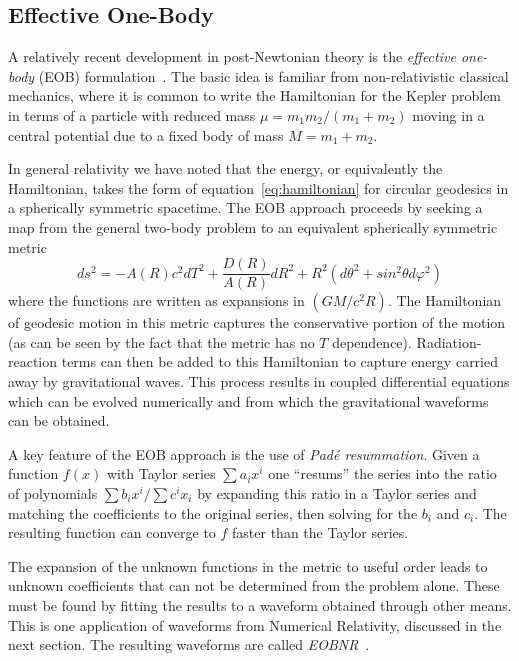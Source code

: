 \subsection{Effective One-Body}
\label{ssec:EOB}

A relatively recent development in post-Newtonian theory is the
\emph{effective one-body} (EOB)
formulation~\cite{BuonannoDamour:1999}.  The basic idea is familiar
from non-relativistic classical mechanics, where it is common to write
the Hamiltonian for the Kepler problem in terms of a particle with
reduced mass $\mu = m_1m_2 /(m_1 + m_2)$ moving in a central potential
due to a fixed body of mass $M = m_1 + m_2$.  

In general relativity we have noted that the energy, or equivalently
the Hamiltonian, takes the form of equation~\ref{eq:hamiltonian} for
circular geodesics in a spherically symmetric spacetime.  The EOB
approach proceeds by seeking a map from the general two-body problem
to an equivalent spherically symmetric metric
%
\begin{equation}
ds^2 = -A(R) c^2 dT^2 + \frac{D(R)}{A(R)} dR^2 + R^2(d\theta^2 + sin^2 \theta
d\varphi^2)
\end{equation}
%
where the functions are written as expansions in $(GM/c^2R)$.  The
Hamiltonian of geodesic motion in this metric captures the
conservative portion of the motion (as can be seen by the fact that
the metric has no $T$ dependence).  Radiation-reaction terms can then
be added to this Hamiltonian to capture energy carried away by
gravitational waves.  This process results in coupled differential
equations which can be evolved numerically and from which the
gravitational waveforms can be obtained.

A key feature of the EOB approach is the use of \emph{Pad\'{e}
resummation}.  Given a function $f(x)$ with Taylor series $\sum a_i
x^i$ one ``resums'' the series into the ratio of polynomials $\sum b_i
x^i/\sum c^i x_i$ by expanding this ratio in a Taylor series and
matching the coefficients to the original series, then solving for the
$b_i$ and $c_i$.  The resulting function can converge to $f$ faster
than the Taylor series.

The expansion of the unknown functions in the metric to useful order
leads to unknown coefficients that can not be determined from the
problem alone.  These must be found by fitting the results to a
waveform obtained through other means.  This is one application of
waveforms from Numerical Relativity, discussed in the next section.
The resulting waveforms are called
\emph{EOBNR}~\cite{Buonanno:2009qa}.


